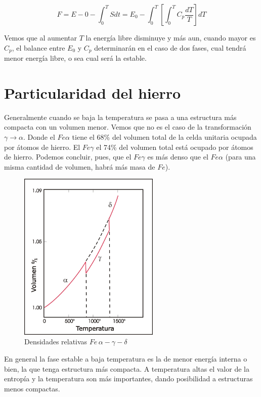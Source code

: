 \begin{equation}
	F=E-{0}-\int_{0}^{T}Sdt=E_{0}-\int_{0}^{T}\left[ \int_{0}^{T}C_{p}\dfrac{dT}{T} \right] dT
\end{equation}

Vemos que al aumentar $T$ la energía libre disminuye y más aun, cuando mayor es $C_{p}$, el balance entre $E_{0}$ y $C_{p}$ determinarán en el caso de dos fases, cual tendrá menor energía libre, o sea cual será la estable.





\section{Particularidad del hierro}
Generalmente cuando se baja la temperatura se pasa a una estructura más compacta con un volumen menor. Vemos que no es el caso de la transformación
$\gamma\rightarrow\alpha$. Donde el $Fe\alpha$ tiene el 68\% del volumen total de la celda unitaria ocupada por átomos de hierro. El $Fe\gamma$ el
74\% del volumen total está ocupado por átomos de hierro. Podemos concluir, pues, que el $Fe\gamma$ es más denso que el $Fe\alpha$ (para una misma cantidad de volumen, habrá más masa de $Fe$).

\begin{figure}[H]
    \centering
    \includegraphics[width=0.6\textwidth]{./Figures/particularidadFe1}
	\caption{Densidades relativas $Fe\,\alpha-\gamma-\delta$}
	\label{fig:particularidadFe1}
\end{figure}

En general la fase estable a baja temperatura es la de menor energía interna o bien, la que tenga estructura más compacta. A temperatura altas el valor de la entropía y la temperatura son más importantes, dando posibilidad a
estructuras menos compactas.


